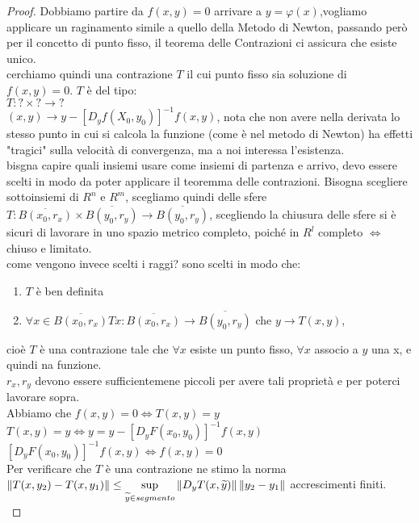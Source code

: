 \begin{proof}
	Dobbiamo partire da $f(x,y)=0$ arrivare a $y=\varphi(x)$,vogliamo applicare un raginamento simile a quello della Metodo di Newton, passando però per il concetto di punto fisso, il teorema delle Contrazioni ci assicura che esiste unico.\\
	cerchiamo quindi una contrazione $T$ il cui punto fisso sia soluzione di $f(x,y)=0$. $T$ è del tipo:\\
	$T:?\times ?\rightarrow ?$\\
	$(x,y)\rightarrow y-[D_yf(X_0,y_0)]^{-1}f(x,y)$, nota che non avere nella derivata lo stesso punto in cui si calcola la funzione (come è nel metodo di Newton) ha effetti "tragici" sulla velocità di convergenza, ma a noi interessa l'esistenza.\\
	bisgna capire quali insiemi usare come insiemi di partenza e arrivo, devo essere scelti in modo da poter applicare il teoremma delle contrazioni. Bisogna scegliere sottoinsiemi di $R^n$ e $R^m$, scegliamo quindi delle sfere\\
	$T:\overline{B(x_0,r_x)}\times\overline{B(y_0,r_y)}\rightarrow\overline{B(y_0,r_y)}$, scegliendo la chiusura delle sfere si è sicuri di lavorare in uno spazio metrico completo, poiché in $R^l$ completo $\Leftrightarrow$ chiuso e limitato.\\
	come vengono invece scelti i raggi? sono scelti in modo che:\\
	\begin{enumerate}
		\item $T$ è ben definita
		\item $\forall x \in \overline{B(x_0,r_x)} Tx: \overline{B(x_0,r_x)}\rightarrow\overline{B(y_0,r_y)}$ che $y\rightarrow T(x,y)$,\\
	\end{enumerate}
	cioè $T$ è una contrazione tale che $\forall x$ esiste un punto fisso, $\forall x$ associo a $y$ una x, e quindi na funzione.\\
	$r_x,r_y$ devono essere sufficientemene piccoli per avere tali proprietà e per poterci lavorare sopra.\\
	Abbiamo che $f(x,y)=0 \Leftrightarrow T(x,y)=y$\\
	$T(x,y)=y\Leftrightarrow y=y-[D_yF(x_0,y_0)]^{-1}f(x,y)$\\
	$[D_yF(x_0,y_0)]^{-1}f(x,y)\Leftrightarrow f(x,y)=0$\\
	Per verificare che $T$ è una contrazione ne stimo la norma\\
	$\left\|T(x,y_2)-T(x,y_1)\right\| \le \sup\limits_{\widetilde{y}\in segmento}\left\|D_yT(x,\widetilde{y})\right\|\left\|y_2-y_1\right\| $  accrescimenti finiti.\\

\end{proof}
